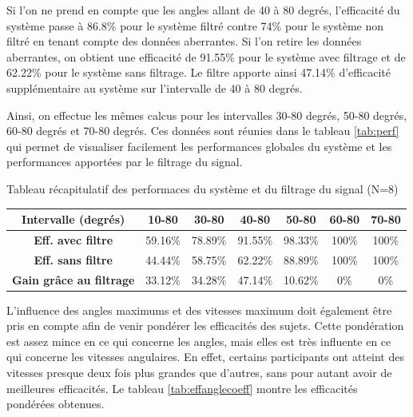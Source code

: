 \documentclass[letterpaper, twoside, 12pt, memoire, creativecommons, hyperref]{thETS}
\begin{document}
Si l'on ne prend en compte que les angles allant de 40 à 80 degrés, l'efficacité du système passe à 86.8\% pour le système filtré contre 74\% pour le système non filtré en tenant compte des données aberrantes. Si l'on retire les données aberrantes, on obtient une efficacité de 91.55\% pour le système avec filtrage et de 62.22\% pour le système sans filtrage. Le filtre apporte ainsi 47.14\% d'efficacité supplémentaire au système sur l'intervalle de 40 à 80 degrés.

Ainsi, on effectue les mêmes calcus pour les intervalles 30-80 degrés, 50-80 degrés, 60-80 degrés et 70-80 degrés. Ces données sont réunies dans le tableau \ref{tab:perf} qui permet de visualiser facilement les performances globales du système et les performances apportées par le filtrage du signal.

\begin{tableap}[*ht]
	\caption{Tableau récapitulatif des performaces du système et du filtrage du signal (N=8)}
		\begin{tabular}{|c|c|c|c|c|c|c|}
		\hline
			{\bf Intervalle (degrés)} & {\bf 10-80} & {\bf 30-80} & {\bf 40-80} & {\bf 50-80} & {\bf 60-80} & {\bf 70-80} \\
	  \hline
			{\bf Eff. avec filtre} & 59.16\% & 78.89\% & 91.55\% & 98.33\% & 100\% & 100\% \\
	  \hline
			{\bf Eff. sans filtre} & 44.44\% & 58.75\% & 62.22\% & 88.89\% & 100\% & 100\% \\
	  \hline
			{\bf Gain grâce au filtrage} & 33.12\% & 34.28\% & 47.14\% & 10.62\% & 0\% & 0\% \\
	  \hline
		\end{tabular}
	\label{tab:perf}
\end{tableap}

L'influence des angles maximums et des vitesses maximum doit également être pris en compte afin de venir pondérer les efficacités des sujets. Cette pondération est assez mince en ce qui concerne les angles, mais elles est très influente en ce qui concerne les vitesses angulaires. En effet, certains participants ont atteint des vitesses presque deux fois plus grandes que d'autres, sans pour autant avoir de meilleures efficacités. Le tableau \ref{tab:effanglecoeff} montre les efficacités pondérées obtenues.
\end{document}
